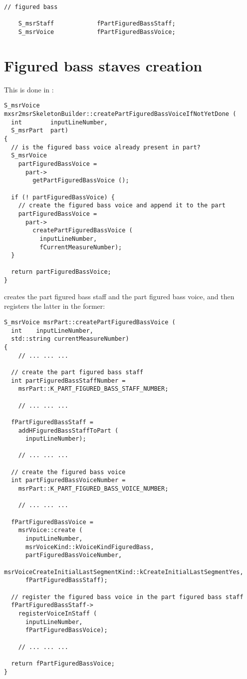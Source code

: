 \begin{lstlisting}[language=CPlusPlus]
    // figured bass

    S_msrStaff            fPartFiguredBassStaff;
    S_msrVoice            fPartFiguredBassVoice;
\end{lstlisting}


\section{Figured bass staves creation}

This is done in :
\begin{lstlisting}[language=CPlusPlus]
S_msrVoice mxsr2msrSkeletonBuilder::createPartFiguredBassVoiceIfNotYetDone (
  int        inputLineNumber,
  S_msrPart  part)
{
  // is the figured bass voice already present in part?
  S_msrVoice
    partFiguredBassVoice =
      part->
        getPartFiguredBassVoice ();

  if (! partFiguredBassVoice) {
    // create the figured bass voice and append it to the part
    partFiguredBassVoice =
      part->
        createPartFiguredBassVoice (
          inputLineNumber,
          fCurrentMeasureNumber);
  }

  return partFiguredBassVoice;
}
\end{lstlisting}

 creates the part figured bass staff and the part figured bass voice, and then registers the latter in the former:
\begin{lstlisting}[language=CPlusPlus]
S_msrVoice msrPart::createPartFiguredBassVoice (
  int    inputLineNumber,
  std::string currentMeasureNumber)
{
	// ... ... ...

  // create the part figured bass staff
  int partFiguredBassStaffNumber =
    msrPart::K_PART_FIGURED_BASS_STAFF_NUMBER;

	// ... ... ...

  fPartFiguredBassStaff =
    addHFiguredBassStaffToPart (
      inputLineNumber);

	// ... ... ...

  // create the figured bass voice
  int partFiguredBassVoiceNumber =
    msrPart::K_PART_FIGURED_BASS_VOICE_NUMBER;

	// ... ... ...

  fPartFiguredBassVoice =
    msrVoice::create (
      inputLineNumber,
      msrVoiceKind::kVoiceKindFiguredBass,
      partFiguredBassVoiceNumber,
      msrVoiceCreateInitialLastSegmentKind::kCreateInitialLastSegmentYes,
      fPartFiguredBassStaff);

  // register the figured bass voice in the part figured bass staff
  fPartFiguredBassStaff->
    registerVoiceInStaff (
      inputLineNumber,
      fPartFiguredBassVoice);

	// ... ... ...

  return fPartFiguredBassVoice;
}
\end{lstlisting}


